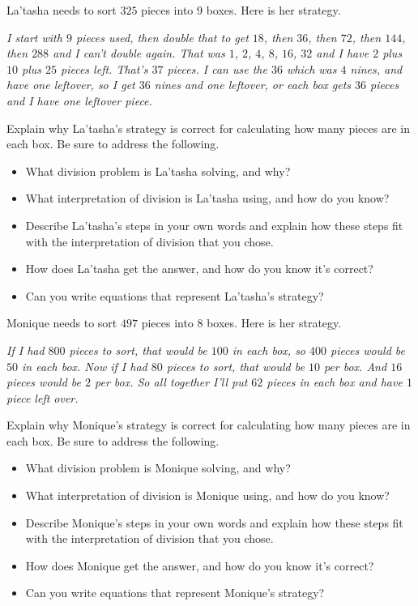 \documentclass[nooutcomes,noauthor, handout]{ximera}
\begin{document}
\begin{problem}
La'tasha needs to sort $325$ pieces into $9$ boxes. Here is her strategy.

\emph{I start with $9$ pieces used, then double that to get $18$, then $36$, then $72$, then $144$, then $288$ and I can't double again. That was $1$, $2$, $4$, $8$, $16$, $32$ and I have $2$ plus $10$ plus $25$ pieces left. That's $37$ pieces. I can use the $36$ which was $4$ nines, and have one leftover, so I get $36$ nines and one leftover, or each box gets $36$ pieces and I have one leftover piece.}

Explain why La'tasha's strategy is correct for calculating how many pieces are in each box. Be sure to address the following.
\begin{itemize}
	\item What division problem is La'tasha solving, and why?
	\item What interpretation of division is La'tasha using, and how do you know?
	\item Describe La'tasha's  steps in your own words and explain how these steps fit with the interpretation of division that you chose.
	\item How does La'tasha get the answer, and how do you know it's correct?
	\item Can you write equations that represent La'tasha's strategy?
\end{itemize}
\end{problem}




\begin{problem}
Monique needs to sort $497$ pieces into $8$ boxes. Here is her strategy.

\emph{If I had $800$ pieces to sort, that would be $100$ in each box, so $400$ pieces would be $50$ in each box. Now if I had $80$ pieces to sort, that would be $10$ per box. And $16$ pieces would be $2$ per box. So all together I'll put $62$ pieces in each box and have $1$ piece left over.}

Explain why Monique's strategy is correct for calculating how many pieces are in each box. Be sure to address the following.
\begin{itemize}
	\item What division problem is Monique solving, and why?
	\item What interpretation of division is Monique using, and how do you know?
	\item Describe Monique's  steps in your own words and explain how these steps fit with the interpretation of division that you chose.
	\item How does Monique get the answer, and how do you know it's correct?
	\item Can you write equations that represent Monique's strategy?
\end{itemize}
\end{problem}
\end{document}
